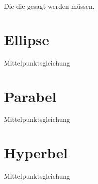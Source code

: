 \setcounter{section}{0}
Die die gesagt werden müssen.
\section{Ellipse}
Mittelpunktsgleichung
\section{Parabel}
Mittelpunktsgleichung
\section{Hyperbel}
Mittelpunktsgleichung